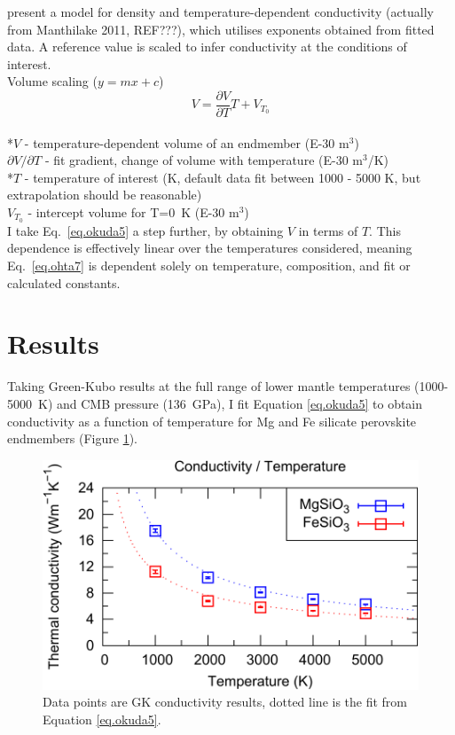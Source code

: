 \citet{Okuda2017} present a model for density and temperature-dependent conductivity (actually from Manthilake 2011, REF???), which utilises exponents obtained from fitted data. A reference value is scaled to infer conductivity at the conditions of interest.\\

Volume scaling ($y=mx+c$)  
\begin{equation}%
V=\frac{\partial V}{\partial T} T+V_{T_{0}}
\label{eq.vol_scale}
\end{equation}%
\\ *$V$ - temperature-dependent volume of an endmember (E-30 m$^3$)\\          
${\partial V}/{\partial T}$ - fit gradient, change of volume with temperature (E-30 m$^3$/K)\\
*$T$ - temperature of interest (K, default data fit between 1000 - 5000 K, but extrapolation should be reasonable)\\
$V_{T_{0}}$ - intercept volume for T=0~K (E-30 m$^3$)\\

I take Eq.~\ref{eq.okuda5} \citep[][Eq. 5]{Okuda2017} a step further, by obtaining $V$ in terms of $T$. This dependence is effectively linear over the temperatures considered, meaning Eq.~\ref{eq.ohta7} \citep[][Eq. 7]{Ohta2017} is dependent solely on temperature, composition, and fit or calculated constants.


\section{Results}

Taking Green-Kubo results at the full range of lower mantle temperatures (1000-5000~K) and CMB pressure (136~GPa), I fit Equation \ref{eq.okuda5} to obtain conductivity as a function of temperature for Mg and Fe silicate perovskite endmembers (Figure \ref{fig:kappa-temp_01}).
\begin{figure}[h!]
  \includegraphics[width=\linewidth]{Figures/k-t_all_01.png}
  \caption{Data points are GK conductivity results, dotted line is the fit from Equation \ref{eq.okuda5}.}
  \label{fig:kappa-temp_01}
\end{figure}

